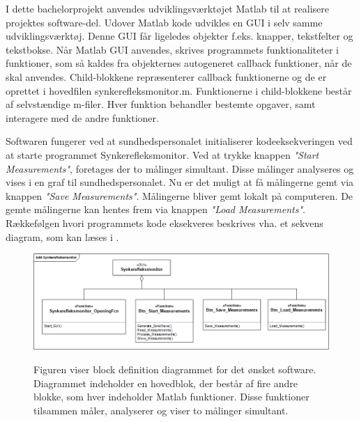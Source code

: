 I dette bachelorprojekt anvendes udviklingsværktøjet Matlab til at realisere projektes software-del. Udover Matlab kode udvikles en GUI i selv samme udviklingsværktøj. Denne GUI får ligeledes objekter f.eks. knapper, tekstfelter og tekstbokse. Når Matlab GUI anvendes, skrives programmets funktionaliteter i funktioner, som så kaldes fra objekternes autogeneret callback funktioner, når de skal anvendes. Child-blokkene repræsenterer callback funktionerne og de er oprettet i hovedfilen synkerefleksmonitor.m. Funktionerne i child-blokkene består af selvstændige m-filer. Hver funktion behandler bestemte opgaver, samt interagere med de andre funktioner.

Softwaren fungerer ved at sundhedspersonalet initialiserer kodeeksekveringen ved at starte programmet Synkerefleksmonitor. Ved at trykke knappen \textit{"Start Measurements"}, foretages der to målinger simultant. Disse målinger analyseres og vises i en graf til sundhedspersonalet. Nu er det muligt at få målingerne gemt via knappen \textit{"Save Measurements"}. Målingerne bliver gemt lokalt på computeren. De gemte målingerne kan hentes frem via knappen \textit{"Load Measurements"}. Rækkefølgen hvori programmets kode eksekveres beskrives vha. et sekvens diagram, som kan læses i .



\begin{figure}[H]
\centering
{\includegraphics[width=\linewidth]
{Figure/SWIBD}}
\caption{Figuren viser block definition diagrammet for det ønsket software. Diagrammet indeholder en hovedblok, der består af fire andre blokke, som hver indeholder Matlab funktioner. Disse funktioner tilsammen måler, analyserer og viser to målinger simultant.}
\label{fig:SWIBD}
\end{figure}

